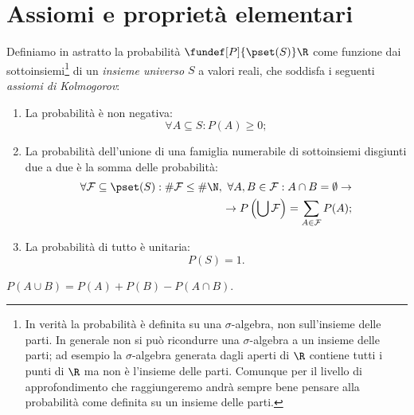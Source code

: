 
\section{Assiomi e proprietà elementari}
\label{sec:assiomi}

\begin{definition}[Probabilità]
	Definiamo in astratto la probabilità $\fundef[P]{\pset(S)}\R$ come funzione dai sottoinsiemi\footnote{%
	In verità la probabilità è definita su una $\sigma$-algebra, non sull'insieme delle parti.
	In generale non si può ricondurre una $\sigma$-algebra a un insieme delle parti;
	ad esempio la $\sigma$-algebra generata dagli aperti di $\R$
	contiene tutti i punti di $\R$ ma non è l'insieme delle parti.
	Comunque per il livello di approfondimento che raggiungeremo
	andrà sempre bene pensare alla probabilità come definita su un insieme delle parti.}
	di un \emph{insieme universo} $S$ a valori reali, che soddisfa i seguenti \emph{assiomi di Kolmogorov}:
	\begin{enumerate}
		\item La probabilità è non negativa:
		\[\forall A\subseteq S:P(A) \ge 0;\]
		\item La probabilità dell'unione di una famiglia numerabile di sottoinsiemi disgiunti due a due
		è la somma delle probabilità:
		\begin{align*}
			\forall \mathcal F\subseteq \pset(S):
			\#\mathcal F\le \#\N,\ 
			\forall A,B\in\mathcal F: A\cap B=\emptyset \rightarrow \\
			\rightarrow P\left(\bigcup\mathcal F\right)=\sum_{A\in\mathcal F}P(A);
		\end{align*}\label{kolm2}
		\item La probabilità di tutto è unitaria:
		\[P(S)=1.\]
	\end{enumerate}
\end{definition}

\begin{theorem}
	$P(A\cup B) = P(A) + P(B) - P(A\cap B)$.
\end{theorem}

